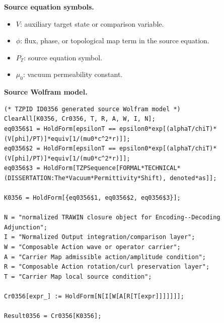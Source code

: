 \begin{minipage}[t]{0.49\linewidth}
\begingroup
\small
\raggedright
\textbf{Source equation symbols.}\par
\begin{itemize}[leftmargin=1.35em,itemsep=1pt,topsep=1pt,parsep=0pt]
    \item $V$: auxiliary target state or comparison variable.
    \item $\phi$: flux, phase, or topological map term in the source equation.
    \item $P_T$: source equation symbol.
    \item $\mu_0$: vacuum permeability constant.
\end{itemize}
\endgroup
\end{minipage}\hfill
\begin{minipage}[t]{0.47\linewidth}
\begingroup
\scriptsize
\raggedright
\textbf{Source Wolfram model.}\par
\begin{Verbatim}[fontsize=\tiny,breaklines=true,breakanywhere=true]
(* TZPID ID0356 generated source Wolfram model *)
ClearAll[K0356, Cr0356, T, R, A, W, I, N];
eq0356$1 = HoldForm[epsilonT == epsilon0*exp[(alphaT/chiT)*(V[phi]/PT)]*equiv[1/(mu0*c^2*r)]];
eq0356$2 = HoldForm[epsilonT == epsilon0*exp[(alphaT/chiT)*(V[phi]/PT)]*equiv[1/(mu0*c^2*r)]];
eq0356$3 = HoldForm[TZPSequence[FORMAL*TECHNICAL*(DISSERTATION:The*Vacuum*Permittivity*Shift), denoted*as]];

K0356 = HoldForm[{eq0356$1, eq0356$2, eq0356$3}];

N = "normalized TRAWIN closure object for Encoding--Decoding Adjunction";
I = "Normalized Output integration/comparison layer";
W = "Composable Action wave or operator carrier";
A = "Carrier Map admissible action/amplitude condition";
R = "Composable Action rotation/curl preservation layer";
T = "Carrier Map local source condition";

Cr0356[expr_] := HoldForm[N[I[W[A[R[T[expr]]]]]]];

Result0356 = Cr0356[K0356];
\end{Verbatim}
\endgroup
\end{minipage}

